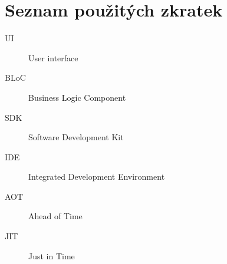 \chapter{Seznam použitých zkratek}

\begin{description}
	\item[UI] User interface
	\item[BLoC] Business Logic Component 
	\item[SDK] Software Development Kit
	\item[IDE] Integrated Development Environment
	\item[AOT] Ahead of Time
	\item[JIT] Just in Time  
\end{description}
